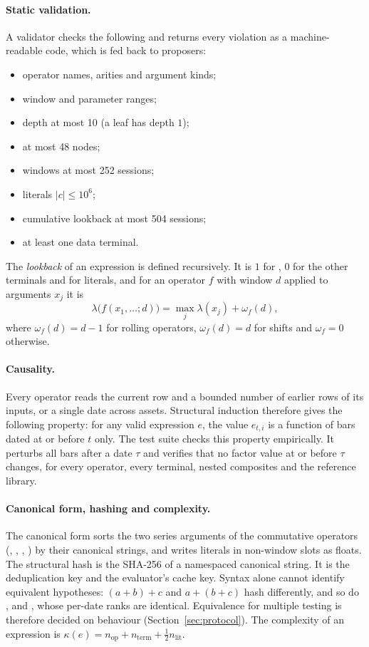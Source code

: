 \paragraph{Static validation.} A validator checks the following and returns
every violation as a machine-readable code, which is fed back to proposers:
\begin{itemize}
  \item operator names, arities and argument kinds;
  \item window and parameter ranges;
  \item depth at most 10 (a leaf has depth $1$);
  \item at most 48 nodes;
  \item windows at most 252 sessions;
  \item literals $|c|\le 10^{6}$;
  \item cumulative lookback at most 504 sessions;
  \item at least one data terminal.
\end{itemize}
The \emph{lookback} of an expression is defined recursively. It is $1$ for
, $0$ for the other terminals and for literals, and for an
operator $f$ with window $d$ applied to arguments $x_j$ it is
\[
\lambda\big(f(x_1,\dots;d)\big)=\max_j \lambda(x_j)+\omega_f(d),
\]
where $\omega_f(d)=d-1$ for rolling operators, $\omega_f(d)=d$ for shifts and
$\omega_f=0$ otherwise.

\paragraph{Causality.} Every operator reads the current row and a bounded
number of earlier rows of its inputs, or a single date across assets.
Structural induction therefore gives the following property: for any valid
expression $e$, the value $e_{t,i}$ is a function of bars dated at or before
$t$ only. The test suite checks this property empirically. It perturbs all
bars after a date $\tau$ and verifies that no factor value at or before
$\tau$ changes, for every operator, every terminal, nested composites and the
reference library.

\paragraph{Canonical form, hashing and complexity.} The canonical form sorts
the two series arguments of the commutative operators (,
, , ) by their canonical strings, and
writes literals in non-window slots as floats. The structural hash is the
SHA-256 of a namespaced canonical string. It is the deduplication key and
the evaluator's cache key. Syntax alone cannot identify equivalent
hypotheses: $(a+b)+c$ and $a+(b+c)$ hash differently, and so do
,  and , whose
per-date ranks are identical. Equivalence for multiple testing is therefore
decided on behaviour (Section~\ref{sec:protocol}). The complexity of an
expression is
$\kappa(e)=n_{\mathrm{op}}+n_{\mathrm{term}}+\tfrac12 n_{\mathrm{lit}}$.


